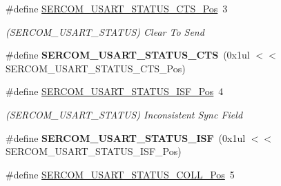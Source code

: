 \begin{DoxyCompactItemize}
\item 
\hypertarget{group___s_a_m_l21___s_e_r_c_o_m_ga82398e32e9838b1158746676a9e4a8ff}{}\#define \hyperlink{group___s_a_m_l21___s_e_r_c_o_m_ga82398e32e9838b1158746676a9e4a8ff}{S\+E\+R\+C\+O\+M\+\_\+\+U\+S\+A\+R\+T\+\_\+\+S\+T\+A\+T\+U\+S\+\_\+\+C\+T\+S\+\_\+\+Pos}~3\label{group___s_a_m_l21___s_e_r_c_o_m_ga82398e32e9838b1158746676a9e4a8ff}

\begin{DoxyCompactList}\small\item\em (S\+E\+R\+C\+O\+M\+\_\+\+U\+S\+A\+R\+T\+\_\+\+S\+T\+A\+T\+U\+S) Clear To Send \end{DoxyCompactList}\item 
\hypertarget{group___s_a_m_l21___s_e_r_c_o_m_ga087a3051c982a22b10648ffb39b685b8}{}\#define {\bfseries S\+E\+R\+C\+O\+M\+\_\+\+U\+S\+A\+R\+T\+\_\+\+S\+T\+A\+T\+U\+S\+\_\+\+C\+T\+S}~(0x1ul $<$$<$ S\+E\+R\+C\+O\+M\+\_\+\+U\+S\+A\+R\+T\+\_\+\+S\+T\+A\+T\+U\+S\+\_\+\+C\+T\+S\+\_\+\+Pos)\label{group___s_a_m_l21___s_e_r_c_o_m_ga087a3051c982a22b10648ffb39b685b8}

\item 
\hypertarget{group___s_a_m_l21___s_e_r_c_o_m_ga79f925cf39d413cf4ac829931944bc69}{}\#define \hyperlink{group___s_a_m_l21___s_e_r_c_o_m_ga79f925cf39d413cf4ac829931944bc69}{S\+E\+R\+C\+O\+M\+\_\+\+U\+S\+A\+R\+T\+\_\+\+S\+T\+A\+T\+U\+S\+\_\+\+I\+S\+F\+\_\+\+Pos}~4\label{group___s_a_m_l21___s_e_r_c_o_m_ga79f925cf39d413cf4ac829931944bc69}

\begin{DoxyCompactList}\small\item\em (S\+E\+R\+C\+O\+M\+\_\+\+U\+S\+A\+R\+T\+\_\+\+S\+T\+A\+T\+U\+S) Inconsistent Sync Field \end{DoxyCompactList}\item 
\hypertarget{group___s_a_m_l21___s_e_r_c_o_m_gabaf1b3e946b71b8541654f57f26f3086}{}\#define {\bfseries S\+E\+R\+C\+O\+M\+\_\+\+U\+S\+A\+R\+T\+\_\+\+S\+T\+A\+T\+U\+S\+\_\+\+I\+S\+F}~(0x1ul $<$$<$ S\+E\+R\+C\+O\+M\+\_\+\+U\+S\+A\+R\+T\+\_\+\+S\+T\+A\+T\+U\+S\+\_\+\+I\+S\+F\+\_\+\+Pos)\label{group___s_a_m_l21___s_e_r_c_o_m_gabaf1b3e946b71b8541654f57f26f3086}

\item 
\hypertarget{group___s_a_m_l21___s_e_r_c_o_m_gaa83c6b9465f1ecd4f143ab84ff4e7811}{}\#define \hyperlink{group___s_a_m_l21___s_e_r_c_o_m_gaa83c6b9465f1ecd4f143ab84ff4e7811}{S\+E\+R\+C\+O\+M\+\_\+\+U\+S\+A\+R\+T\+\_\+\+S\+T\+A\+T\+U\+S\+\_\+\+C\+O\+L\+L\+\_\+\+Pos}~5\label{group___s_a_m_l21___s_e_r_c_o_m_gaa83c6b9465f1ecd4f143ab84ff4e7811}


\end{DoxyCompactItemize}
